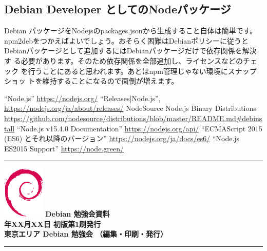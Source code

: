 \documentclass[mingoth,a4paper]{jsarticle}
\newcommand{\debmtgyear}{2020}
\newcommand{\debmtgmonth}{XX}
\newcommand{\debmtgdate}{XX}
\begin{document}
\subsection{Debian Developer としてのNodeパッケージ}

Debian パッケージをNodejsのpackages.jsonから生成すること自体は簡単です。
npm2debをつかえばよいでしょう。おそらく困難はDebianポリシーに従うと
Debianパッケージとして追加するにはDebianパッケージだけで依存関係を解決す
る必要があります。そのため依存関係を全部追加し、ライセンスなどのチェック
を行うことにあると思われます。あとはnpm管理じゃない環境にスナップショッ
トを維持することになるので面倒が増えます。



\begin{thebibliography}{1}
  ``Node.js'' \url{https://nodejs.org/}
  ``Releases|Node.js'', \url{https://nodejs.org/ja/about/releases/}
  NodeSource Node.js Binary Distributions
	 \url{https://github.com/nodesource/distributions/blob/master/README.md#debinstall}
  ``Node.js v15.4.0 Documentation''  \url{https://nodejs.org/api/}
  ``ECMAScript 2015 (ES6) とそれ以降のバージョン''
	 \url{https://nodejs.org/ja/docs/es6/}
  ``Node.js ES2015 Support'' \url{https://node.green/}
\end{thebibliography}



\mbox{}\newpage
\mbox{}\newpage

\vspace*{15cm}
\hrule
\vspace{2mm}
\includegraphics[width=2cm]{image200502/openlogo-nd.eps}
\noindent \Large \bf Debian 勉強会資料\\
\noindent \normalfont \debmtgyear{}年\debmtgmonth{}月\debmtgdate{}日 \hspace{5mm}  初版第1刷発行\\
\noindent \normalfont 東京エリア Debian 勉強会 （編集・印刷・発行）\\
\hrule
\end{document}

